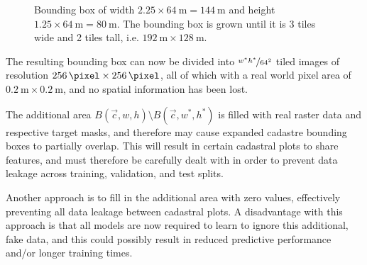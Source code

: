 \begin{figure}[H]
  \centering
  
  \caption{
    Bounding box of width $2.25 \times \SI{64}{\meter} = \SI{144}{\meter}$ and height $1.25 \times \SI{64}{\meter} = \SI{80}{\meter}$.
    The bounding box is grown until it is 3 tiles wide and 2 tiles tall, i.e. $\SI{192}{\meter} \times \SI{128}{\meter}$.
  }
  \label{fig:bbox-growing}
\end{figure}

The resulting bounding box can now be divided into $\nicefrac{w^*h^*}{64^2}$ tiled images of resolution $\SI{256}{\pixel} \times \SI{256}{\pixel}$, all of which with a real world pixel area of $\SI{0.2}{\meter} \times \SI{0.2}{\meter}$, and no spatial information has been lost.

The additional area $B(\vec{c}, w, h) \setminus B(\vec{c}, w^*, h^*)$ is filled with real raster data and respective target masks, and therefore may cause expanded cadastre bounding boxes to partially overlap.
This will result in certain cadastral plots to share features, and must therefore be carefully dealt with in order to prevent data leakage across training, validation, and test splits.

Another approach is to fill in the additional area with zero values, effectively preventing all data leakage between cadastral plots.
A disadvantage with this approach is that all models are now required to learn to ignore this additional, fake data, and this could possibly result in reduced predictive performance and/or longer training times.
